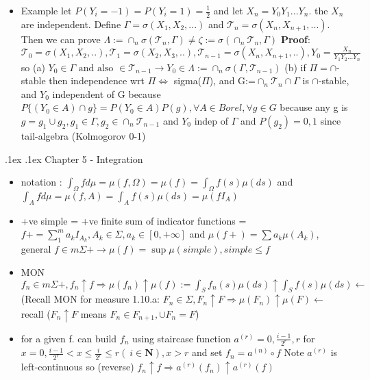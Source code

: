 \documentclass[10pt,landscape,a4paper]{article}
\makeatletter
\renewcommand{\section}{\@startsection{section}{1}{0mm}%
                                {.1ex}%
                                {.1ex}%
                                {\color{blue}\sffamily\small\bfseries}}
\newcommand{\Tau}{\mathcal{T}}
\makeatother
\begin{document}
\begin{multicols*}{3}
\begin{spacing}{0.5}
\begin{itemize}
\item \colorbox{green!10}{Example} let $P(Y_i=-1)=P(Y_i=1)=\frac{1}{2} $ and let $X_n=Y_0Y_1...Y_n$. the $X_n$ are independent. Define $\Gamma=\sigma(X_1,X_2,...)$ and $\Tau_n=\sigma(X_n,X_{n+1},...)$. Then we can prove $\Lambda := \cap_n \sigma(\Tau_n,\Gamma) \neq \zeta := \sigma(\cap_n \Tau_n,\Gamma)$ \textbf{Proof}: $\Tau_0=\sigma(X_1,X_2,..),\Tau_1=\sigma(X_2,X_3,..),\Tau_{n-1}=\sigma(X_n,X_{n+1},..), Y_0=\frac{X_n}{Y_1Y_2...Y_n}$ so (a) $Y_0 \in \Gamma \text{ and also } \in \Tau_{n-1} \rightarrow Y_0 \in \Lambda := \cap_n \sigma (\Gamma,\Tau_{n-1})$ (b) if $\Pi=\cap$-stable then independence wrt $\Pi \Leftrightarrow $ sigma($\Pi$), and G:=$\cap_n \Tau_n \cap \Gamma$ is $\cap$-stable, and $Y_0$ independent of G because  $P\big \{ (Y_0 \in A) \cap g \big \} = P(Y_0 \in A)P(g),\forall A \in Borel,\forall g \in G$ because any g is $g=g_1 \cup g_2, g_1 \in \Gamma, g_2 \in \cap_n \Tau_{n-1}$ and $Y_0$ indep of $\Gamma$ and $P(g_2)=0,1$ since tail-algebra (Kolmogorov 0-1)

\end{itemize}

\section{Chapter 5 - Integration}
\begin{itemize}

\item notation : $\int_{\Omega} f d\mu = \mu (f,\Omega) = \mu (f) = \int_{\Omega} f(s) \mu(ds)$ and $\int_{A} f d\mu = \mu (f,A) = \int_{A} f(s) \mu(ds) = \mu(fI_A)$

\item +ve simple = +ve finite sum of indicator functions = $f+ = \sum_1^m a_k I_{A_k},A_k \in \Sigma, a_k \in [0, +\infty ]$ and $\mu(f+)=\sum a_k \mu(A_k)$, general $f \in m\Sigma+ \rightarrow \mu(f) = \sup \mu(simple), simple \le f$

\item \colorbox{red!10}{MON} $\boxed{ {f_n} \in m\Sigma+, f_n \uparrow f \Rightarrow \mu(f_n) \uparrow \mu(f) := \int_S f_n(s) \mu(ds) \uparrow \int_S f(s) \mu(ds) } \longleftarrow $ (Recall \colorbox{red!10}{MON for measure}  1.10.a: $F_n \in \Sigma, F_n \uparrow F \Rightarrow \mu(F_n) \uparrow \mu(F) \longleftarrow $ recall ($F_n \uparrow F$ means $F_n \in F_{n+1} , \cup F_n = F$)
\item for a given f. can build $f_n$ using staircase function $a^{(r)}=0,\frac{i-1}{2^r},r$ for $x=0,\frac{i-1}{2^r} < x \le \frac{i}{2^r} \le r (\ i \in \mathbf{N}) , x>r$ and set $f_n = a^{(n)} \circ f$ Note $a^{(r)}$ is left-continuous so (reverse) $f_n \uparrow f \Rightarrow a^{(r)}(f_n) \uparrow a^{(r)}(f)$


\end{itemize}
\end{spacing}
\end{multicols*}
\end{document}
